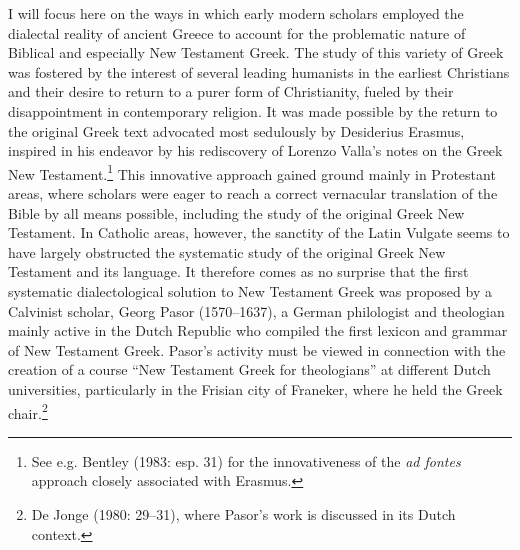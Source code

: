 \documentclass[12pt]{article}
\newenvironment{styleStandard}{\renewcommand\baselinestretch{1.25}\setlength\leftskip{0in}\setlength\rightskip{0in}\setlength\parindent{0.1972in}\setlength\parfillskip{0pt plus 1fil}\setlength\parskip{0in plus 1pt}\writerlistparindent\writerlistleftskip\leavevmode\normalfont\normalsize\writerlistlabel\ignorespaces}{\unskip\vspace{0in plus 1pt}\par}
\newcommand\writerlistleftskip{}
\newcommand\writerlistparindent{}
\newcommand\writerlistlabel{}
\begin{document}
\begin{styleStandard}
I will focus here on the ways in which early modern scholars employed the dialectal reality of ancient Greece to account for the problematic nature of Biblical and especially New Testament Greek. The study of this variety of Greek was fostered by the interest of several leading humanists in the earliest Christians and their desire to return to a purer form of Christianity, fueled by their disappointment in contemporary religion. It was made possible by the return to the original Greek text advocated most sedulously by Desiderius Erasmus, inspired in his endeavor by his rediscovery of Lorenzo Valla’s notes on the Greek New Testament.\footnote{ See e.g. Bentley (1983: esp. 31) for the innovativeness of the \textit{ad fontes} approach closely associated with Erasmus.} This innovative approach gained ground mainly in Protestant areas, where scholars were eager to reach a correct vernacular translation of the Bible by all means possible, including the study of the original Greek New Testament. In Catholic areas, however, the sanctity of the Latin Vulgate seems to have largely obstructed the systematic study of the original Greek New Testament and its language. It therefore comes as no surprise that the first systematic dialectological solution to New Testament Greek was proposed by a Calvinist scholar, Georg Pasor (1570–1637), a German philologist and theologian mainly active in the Dutch Republic who compiled the first lexicon and grammar of New Testament Greek. Pasor’s activity must be viewed in connection with the creation of a course “New Testament Greek for theologians” at different Dutch universities, particularly in the Frisian city of Franeker, where he held the Greek chair.\footnote{ De Jonge (1980: 29–31), where Pasor’s work is discussed in its Dutch context.}
\end{styleStandard}
\end{document}
